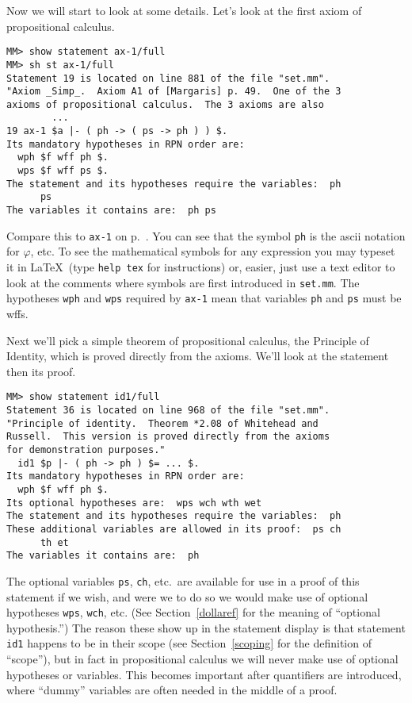 Now we will start to look at some details.  Let's look at the first
axiom of propositional calculus.

\begin{verbatim}
MM> show statement ax-1/full
MM> sh st ax-1/full
Statement 19 is located on line 881 of the file "set.mm".
"Axiom _Simp_.  Axiom A1 of [Margaris] p. 49.  One of the 3
axioms of propositional calculus.  The 3 axioms are also
        ...
19 ax-1 $a |- ( ph -> ( ps -> ph ) ) $.
Its mandatory hypotheses in RPN order are:
  wph $f wff ph $.
  wps $f wff ps $.
The statement and its hypotheses require the variables:  ph
      ps
The variables it contains are:  ph ps
\end{verbatim}

Compare this to \texttt{ax-1} on p.~\pageref{ax1}.  You can see that the
symbol \texttt{ph} is the {\sc ascii} notation for $\varphi$, etc.  To
see the mathematical symbols for any expression you may typeset it in
\LaTeX\ (type \texttt{help tex} for instructions)
or, easier, just use a text editor to look at the comments where symbols
are first introduced in \texttt{set.mm}.  The hypotheses \texttt{wph}
and \texttt{wps} required by \texttt{ax-1} mean that variables
\texttt{ph} and \texttt{ps} must be wffs.

Next we'll pick a simple theorem of propositional calculus, the Principle of
Identity, which is proved directly from the axioms.  We'll look at the
statement then its proof.

\begin{verbatim}
MM> show statement id1/full
Statement 36 is located on line 968 of the file "set.mm".
"Principle of identity.  Theorem *2.08 of Whitehead and
Russell.  This version is proved directly from the axioms
for demonstration purposes."
  id1 $p |- ( ph -> ph ) $= ... $.
Its mandatory hypotheses in RPN order are:
  wph $f wff ph $.
Its optional hypotheses are:  wps wch wth wet
The statement and its hypotheses require the variables:  ph
These additional variables are allowed in its proof:  ps ch
      th et
The variables it contains are:  ph
\end{verbatim}

The optional variables \texttt{ps}, \texttt{ch}, etc.\ are
available for use in a proof of this statement if we wish, and were we to do
so we would make use of optional hypotheses \texttt{wps}, \texttt{wch}, etc.  (See
Section~\ref{dollaref} for the meaning of ``optional
hypothesis.'') The reason these show up in the
statement display is that statement \texttt{id1} happens to be in their scope
(see Section~\ref{scoping} for the definition of ``scope''), but
in fact in propositional calculus we will never make use of optional
hypotheses or variables.  This becomes important after quantifiers are
introduced, where ``dummy'' variables are often needed
in the middle of a proof.


